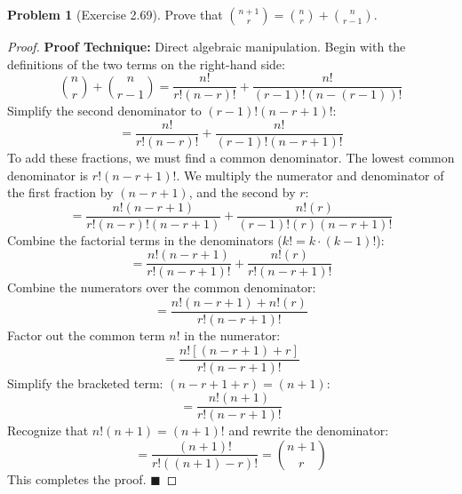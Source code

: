 \documentclass[11pt, letterpaper]{article}
\theoremstyle{definition}
\newtheorem{problem}{Problem}
\begin{document}
\vspace{0.5cm}

\begin{problem}[Exercise 2.69]
Prove that $\binom{n+1}{r} = \binom{n}{r} + \binom{n}{r-1}$.
\end{problem}
\begin{proof}
\textbf{Proof Technique:} Direct algebraic manipulation.
Begin with the definitions of the two terms on the right-hand side:
\[ \binom{n}{r} + \binom{n}{r-1} = \frac{n!}{r!(n-r)!} + \frac{n!}{(r-1)!(n-(r-1))!} \]
Simplify the second denominator to $(r-1)!(n-r+1)!$:
\[ = \frac{n!}{r!(n-r)!} + \frac{n!}{(r-1)!(n-r+1)!} \]
To add these fractions, we must find a common denominator. The lowest common denominator is $r!(n-r+1)!$. We multiply the numerator and denominator of the first fraction by $(n-r+1)$, and the second by $r$:
\[ = \frac{n!(n-r+1)}{r!(n-r)!(n-r+1)} + \frac{n!(r)}{(r-1)!(r)(n-r+1)!} \]
Combine the factorial terms in the denominators ($k! = k \cdot (k-1)!$):
\[ = \frac{n!(n-r+1)}{r!(n-r+1)!} + \frac{n!(r)}{r!(n-r+1)!} \]
Combine the numerators over the common denominator:
\[ = \frac{n!(n-r+1) + n!(r)}{r!(n-r+1)!} \]
Factor out the common term $n!$ in the numerator:
\[ = \frac{n! [ (n-r+1) + r ]}{r!(n-r+1)!} \]
Simplify the bracketed term: $(n - r + 1 + r) = (n + 1)$:
\[ = \frac{n!(n+1)}{r!(n-r+1)!} \]
Recognize that $n!(n+1) = (n+1)!$ and rewrite the denominator:
\[ = \frac{(n+1)!}{r!((n+1)-r)!} = \binom{n+1}{r} \]
This completes the proof. $\blacksquare$
\end{proof}

\vspace{0.5cm}
\end{document}
